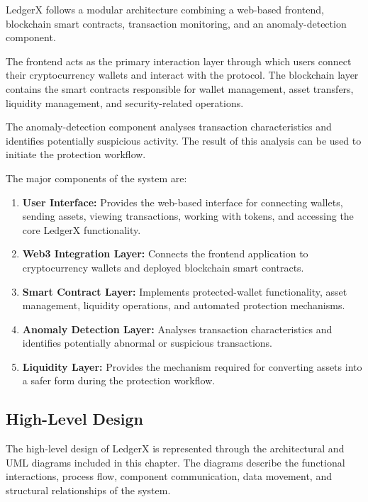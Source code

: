 \documentclass{tietreport}
\begin{document}
LedgerX follows a modular architecture combining a web-based
frontend, blockchain smart contracts, transaction monitoring, and an
anomaly-detection component.

The frontend acts as the primary interaction layer through which
users connect their cryptocurrency wallets and interact with the
protocol. The blockchain layer contains the smart contracts
responsible for wallet management, asset transfers, liquidity
management, and security-related operations.

The anomaly-detection component analyses transaction characteristics
and identifies potentially suspicious activity. The result of this
analysis can be used to initiate the protection workflow.

The major components of the system are:

\begin{enumerate}
  \item \textbf{User Interface:}
  Provides the web-based interface for connecting wallets, sending
  assets, viewing transactions, working with tokens, and accessing
  the core LedgerX functionality.

  \item \textbf{Web3 Integration Layer:}
  Connects the frontend application to cryptocurrency wallets and
  deployed blockchain smart contracts.

  \item \textbf{Smart Contract Layer:}
  Implements protected-wallet functionality, asset management,
  liquidity operations, and automated protection mechanisms.

  \item \textbf{Anomaly Detection Layer:}
  Analyses transaction characteristics and identifies potentially
  abnormal or suspicious transactions.

  \item \textbf{Liquidity Layer:}
  Provides the mechanism required for converting assets into a safer
  form during the protection workflow.
\end{enumerate}

\subsection{High-Level Design}

The high-level design of LedgerX is represented through the
architectural and UML diagrams included in this chapter. The
diagrams describe the functional interactions, process flow,
component communication, data movement, and structural relationships
of the system.
\end{document}
